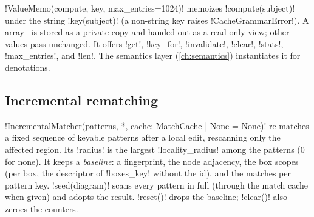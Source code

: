 \py!ValueMemo(compute, key, max_entries=1024)! memoizes \py!compute(subject)! under the string
\py!key(subject)! (a non-string key raises \py!CacheGrammarError!). A 
array~\cite{harris2020numpy} is stored as a private copy and handed out as a read-only view; other
values pass unchanged. It offers \py!get!, \py!key_for!, \py!invalidate!, \py!clear!, \py!stats!,
\py!max_entries!, and \py!len!. The semantics layer (\cref{ch:semantics}) instantiates it for
denotations.

\subsection{Incremental rematching}

\py!IncrementalMatcher(patterns, *, cache: MatchCache | None = None)! re-matches a fixed sequence of
keyable patterns after a local edit, rescanning only the affected region. Its \py!radius! is the
largest \py!locality_radius! among the patterns ($0$ for none). It keeps a \emph{baseline}: a
fingerprint, the node adjacency, the box scopes (per box, the descriptor of \py!boxes_key! without
the id), and the matches per pattern key.
\py!seed(diagram)! scans every pattern in full (through the match cache when given) and adopts the
result. \py!reset()! drops the baseline; \py!clear()! also zeroes the counters.

